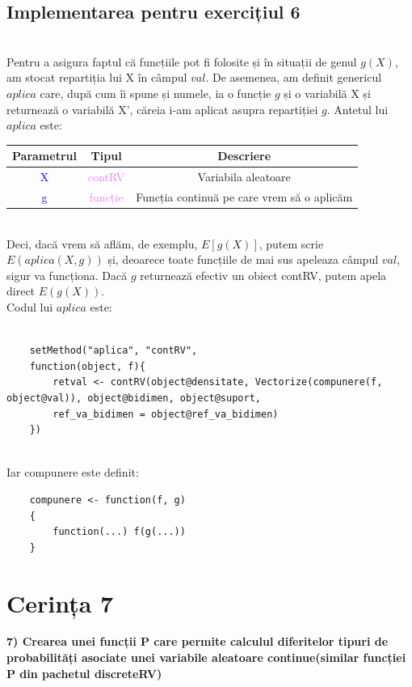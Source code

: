 \documentclass[12pt]{article}
\begin{document}
\subsection{Implementarea pentru exercițiul 6}\hfill \\
\indent Pentru a asigura faptul că funcțiile pot fi folosite și în situații de genul $g(X)$, am stocat repartiția lui X în câmpul $val$. De asemenea, am definit genericul $aplica$ care, după cum îi spune și numele, ia o funcție $g$ și o variabilă X și returnează o variabilă X', căreia i-am aplicat asupra repartiției $g$. Antetul lui $aplica$ este:
\begin{center}
	\begin{tabular}{|| c | c | c ||}
		\hline
		Parametrul & Tipul & Descriere \\
		\hline
		\textcolor{blue}{X} & \textcolor{violet}{contRV} & Variabila aleatoare\\
		\hline
		\textcolor{blue}{g} & \textcolor{violet}{funcție} & Funcția continuă pe care vrem să o aplicăm\\
		\hline
	\end{tabular}
\end{center}\hfill \\
\indent Deci, dacă vrem să aflăm, de exemplu, $E[g(X)]$, putem scrie $E(aplica(X, g))$ și, deoarece toate funcțiile de mai sus apeleaza câmpul $val$, sigur va funcționa. Dacă $g$ returnează efectiv un obiect contRV, putem apela direct $E(g(X))$. \\
\indent Codul lui $aplica$ este:\\\\
\begin{lstlisting}
	setMethod("aplica", "contRV",
	function(object, f){
		retval <- contRV(object@densitate, Vectorize(compunere(f, object@val)), object@bidimen, object@suport,
		ref_va_bidimen = object@ref_va_bidimen)
	})
\end{lstlisting}\hfill \\
\indent Iar compunere este definit:
\begin{lstlisting}
	compunere <- function(f, g)
	{
		function(...) f(g(...))
	}
\end{lstlisting} \pagebreak

	\section{Cerința 7}
\textbf{7) Crearea unei funcții P care permite calculul diferitelor tipuri de probabilități asociate
	unei variabile aleatoare continue(similar funcției P din pachetul discreteRV) }\vspace{5mm}
\end{document}
